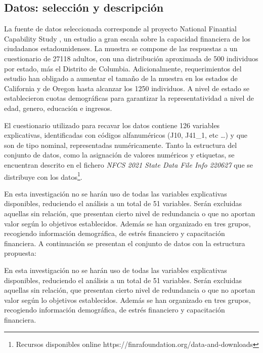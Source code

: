 \documentclass[a4paper, 11pt]{article}
\begin{document}
\subsection{Datos: selección y descripción}
\label{sec:sub:datasets}
La fuente de datos seleccionada corresponde al proyecto National Finantial Capability Study 
\cite{NFCS01}, un estudio a gran escala sobre la capacidad financiera de los ciudadanos 
estadounidenses. La muestra se compone de las respuestas a un cuestionario de 27118 adultos, 
con una distribución aproximada de 500 individuos por estado, más el Distrito de Columbia. 
Adicionalmente, requerimientos del estudio han obligado a aumentar el tamaño de la muestra en 
los estados de California y de Oregon hasta alcanzar los 1250 individuos. A nivel de estado 
se establecieron cuotas demográficas para garantizar la representatividad a nivel de edad,
genero, educación e ingresos.

El cuestionario utilizado para recavar los datos contiene 126 variables explicativas, 
identificadas con códigos alfanuméricos (J10, J41\_1, etc \dots) y que son de tipo nominal, 
representadas numéricamente. Tanto la estructura del conjunto de datos, como la asignación de 
valores numéricos y etiquetas, se encuentran descrito en el fichero \textit{NFCS 2021 State 
Data File Info 220627} que se distribuye con los datos\footnote{Recursos disponibles online 
https://finrafoundation.org/data-and-downloads}. 

En esta investigación no se harán uso de todas las variables explicativas disponibles, 
reduciendo el análisis a un total de 51 variables. Serán excluidas aquellas sin relación, que 
presentan cierto nivel de redundancia o que no aportan valor según lo objetivos establecidos. 
Además se han organizado en tres grupos, recogiendo información demográfica, de estrés 
financiero y capacitación financiera. 
A continuación se presentan el conjunto de datos con la  estructura propuesta:

En esta investigación no se harán uso de todas las variables explicativas disponibles, reduciendo el análisis a un total de 51 variables. Serán excluidas aquellas sin relación, que presentan cierto nivel de redundancia o que no aportan valor según lo
objetivos establecidos. Además se han organizado en tres grupos, recogiendo información demográfica, de estrés financiero y
capacitación financiera. 
\end{document}
